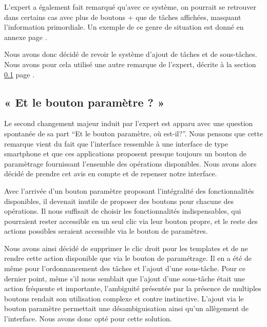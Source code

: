 \documentclass[11pt]{article}
\begin{document}
L'expert a également fait remarqué qu'avec ce système, on pourrait se
retrouver dans certains cas avec plus de boutons + que de tâches
affichées, masquant l'information primordiale. Un exemple de ce genre
de situation est donné en annexe page \pageref{ann:plusplusplus}.

Nous avons donc décidé de revoir le système d'ajout de tâches et de
sous-tâches. Nous avons pour cela utilisé une autre remarque de
l'expert, décrite à la section \ref{subsec:parameterButton} page
\pageref{subsec:parameterButton}.




\subsection{« Et le bouton paramètre ? »}
\label{subsec:parameterButton}


Le second changement majeur induit par l'expert est apparu avec une
question spontanée de sa part ``Et le bouton paramètre, où
est-il?''. Nous pensons que cette remarque vient du fait que
l'interface ressemble à une interface de type smartphone et que ces
applications proposent presque toujours un bouton de paramètrage
fournissant l'ensemble des opérations disponibles. Nous avons alors
décidé de prendre cet avis en compte et de repenser notre interface.

Avec l'arrivée d'un bouton paramètre proposant l'intégralité des
fonctionnalités disponibles, il devenait inutile de proposer des
boutons pour chacune des opérations. Il nous suffisait de choisir les
fonctionnalités indispensables, qui pourraient rester accessible en un
seul clic via leur bouton propre, et le reste des actions possibles
seraient accessible via le bouton de paramètres.

Nous avons ainsi décidé de supprimer le clic droit pour les templates
et de ne rendre cette action disponible que via le bouton de
paramétrage. Il en a été de même pour l'ordonnancement des tâches et
l'ajout d'une sous-tâche. Pour ce dernier point, même s'il nous
semblait que l'ajout d'une sous-tâche était une action fréquente et
importante, l'ambiguité présentée par la présence de multiples boutons
rendait son utilisation complexe et contre instinctive. L'ajout via le
bouton paramètre permettait une désambiguisation ainsi qu'un
allègement de l'interface. Nous avons donc opté pour cette solution.
\end{document}
